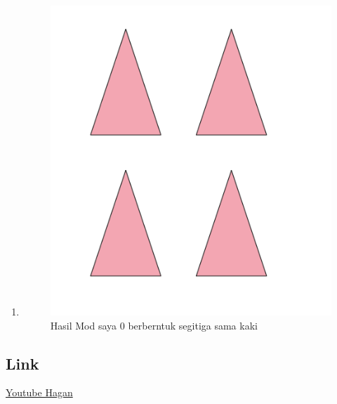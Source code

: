 \begin{enumerate}
    \item 
	
	\begin{figure}[H]
		\includegraphics[width=12cm]{figures/1174040/Python1/SoalMod.PNG}
		\centering
		\caption{Hasil Mod saya 0 berberntuk segitiga sama kaki}
	\end{figure}
\end{enumerate}

\subsection{Link}
\href{https://www.youtube.com/watch?v=KZqMu3yXU5M}{Youtube Hagan}